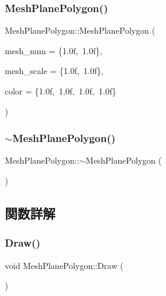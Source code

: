 \subsubsection{\texorpdfstring{Mesh\+Plane\+Polygon()}{MeshPlanePolygon()}}
{\footnotesize\ttfamily Mesh\+Plane\+Polygon\+::\+Mesh\+Plane\+Polygon (\begin{DoxyParamCaption}\item[{\mbox{\hyperlink{_vector3_d_8h_a5ef6e95dfc5f9d3820b71772d99bbc25}{Vec2}}}]{mesh\+\_\+num = {\ttfamily \{1.0f,~1.0f\}},  }\item[{\mbox{\hyperlink{_vector3_d_8h_a5ef6e95dfc5f9d3820b71772d99bbc25}{Vec2}}}]{mesh\+\_\+scale = {\ttfamily \{1.0f,~1.0f\}},  }\item[{\mbox{\hyperlink{_vector3_d_8h_a680c30c4a07d86fe763c7e01169cd6cc}{X\+Color4}}}]{color = {\ttfamily \{1.0f,~1.0f,~1.0f,~1.0f\}} }\end{DoxyParamCaption})}

\mbox{\label{class_mesh_plane_polygon_a6c76a24c3f35cd9a77e6947c22fa4c3d}} 
\subsubsection{\texorpdfstring{$\sim$\+Mesh\+Plane\+Polygon()}{~MeshPlanePolygon()}}
{\footnotesize\ttfamily Mesh\+Plane\+Polygon\+::$\sim$\+Mesh\+Plane\+Polygon (\begin{DoxyParamCaption}{ }\end{DoxyParamCaption})\hspace{0.3cm}{\ttfamily [virtual]}}



\subsection{関数詳解}
\mbox{\label{class_mesh_plane_polygon_a813d5d6897ec0ce2b672cd6e1360e281}} 
\subsubsection{\texorpdfstring{Draw()}{Draw()}}
{\footnotesize\ttfamily void Mesh\+Plane\+Polygon\+::\+Draw (\begin{DoxyParamCaption}{ }\end{DoxyParamCaption})}


